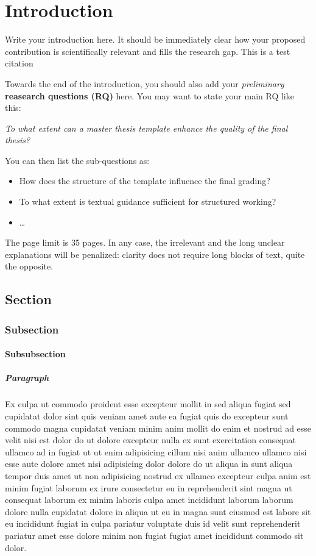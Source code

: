 \chapter{Introduction}
\label{sec:introduction}
Write your introduction here. It should be immediately clear how your proposed contribution is scientifically relevant and fills the research gap.
  This is a test citation \cite{Gruber1995}

Towards the end of the introduction, you should also add your \textit{preliminary} \textbf{reasearch questions (RQ)} here. You may want to state your main RQ like this:

\noindent\textit{To what extent can a master thesis template enhance the quality of the final thesis?}

You can then list the sub-questions as:
\begin{itemize}
    \item How does the structure of the template influence the final grading?
    \item To what extent is textual guidance sufficient for structured working?
    \item \dots
\end{itemize}


The page limit is 35 pages. In any case, the irrelevant and the long unclear explanations will be penalized: clarity does not require long blocks of text, quite the opposite.


\section{Section}
  \subsection{Subsection}
    \subsubsection{Subsubsection}
      \paragraph{Paragraph} Ex culpa ut commodo proident esse excepteur mollit in sed aliqua fugiat sed cupidatat dolor sint quis veniam amet aute ea fugiat quis do excepteur sunt commodo magna cupidatat veniam minim anim mollit do enim et nostrud ad esse velit nisi est dolor do ut dolore excepteur nulla ex sunt exercitation consequat ullamco ad in fugiat ut ut enim adipisicing cillum nisi anim ullamco ullamco nisi esse aute dolore amet nisi adipisicing dolor dolore do ut aliqua in sunt aliqua tempor duis amet ut non adipisicing nostrud ex ullamco excepteur culpa anim est minim fugiat laborum ex irure consectetur eu in reprehenderit sint magna ut consequat laborum ex minim laboris culpa amet incididunt laborum laborum dolore nulla cupidatat dolore in aliqua ut eu in magna sunt eiusmod est labore sit eu incididunt fugiat in culpa pariatur voluptate duis id velit sunt reprehenderit pariatur amet esse dolore minim non fugiat fugiat amet incididunt commodo sit dolor.

